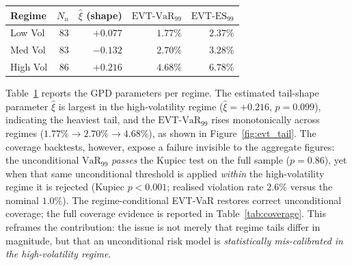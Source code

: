 \documentclass[]{interact}
\begin{document}
\begin{table}[H]
{\renewcommand{\arraystretch}{1.25}
\setlength{\tabcolsep}{5pt}
\begin{tabular}{lrrrr}
\toprule
\textbf{Regime} & \textbf{$N_u$} & \textbf{$\hat{\xi}$ (shape)} & \textbf{$\text{EVT-VaR}_{99}$} & \textbf{$\text{EVT-ES}_{99}$} \\
\midrule
Low Vol  & 83 & $+0.077$ & $1.77\%$ & $2.37\%$ \\
Med Vol  & 83 & $-0.132$ & $2.70\%$ & $3.28\%$ \\
High Vol & 86 & $+0.216$ & $4.68\%$ & $6.78\%$ \\
\bottomrule
\end{tabular}}
\label{tab:evt}
\end{table}

Table~\ref{tab:evt} reports the GPD parameters per regime. The estimated tail-shape parameter $\hat{\xi}$ is largest in the
high-volatility regime ($\hat{\xi}=+0.216$, $p=0.099$), indicating the
heaviest tail, and the $\text{EVT-VaR}_{99}$ rises monotonically across regimes
($1.77\%\!\rightarrow\!2.70\%\!\rightarrow\!4.68\%$), as shown in Figure~\ref{fig:evt_tail}. The
coverage backtests, however, expose a failure invisible to the aggregate figures: the
unconditional $\text{VaR}_{99}$ \emph{passes} the Kupiec test on the full sample
($p=0.86$), yet when that same unconditional threshold is applied
\emph{within} the high-volatility regime it is rejected
(Kupiec $p<0.001$; realised violation rate $2.6\%$ versus the nominal
$1.0\%$). The regime-conditional EVT-VaR restores correct unconditional coverage; the full coverage evidence is reported in Table~\ref{tab:coverage}. This reframes the contribution: the issue is not merely that
regime tails differ in magnitude, but that an unconditional risk model is
\emph{statistically mis-calibrated in the high-volatility regime}.
\end{document}
